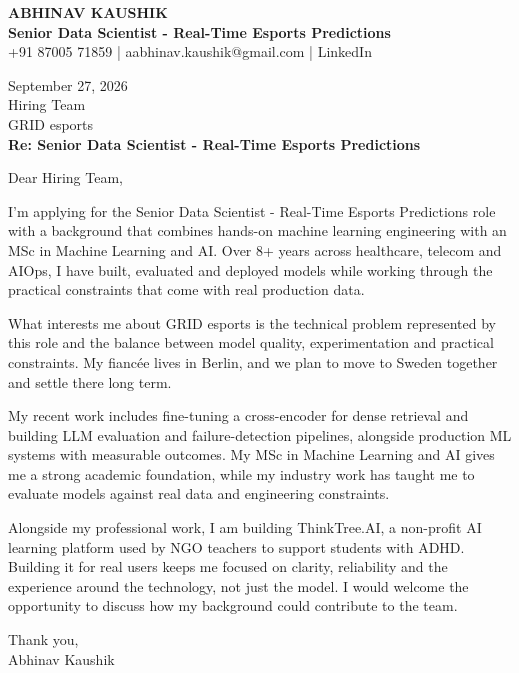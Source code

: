 \documentclass[10pt,a4paper]{article}
\begin{document}
\begin{center}
{\Large\bfseries ABHINAV KAUSHIK}\\[2pt]
{\bfseries Senior Data Scientist - Real-Time Esports Predictions}\\[2pt]
+91 87005 71859 \quad | \quad aabhinav.kaushik@gmail.com \quad | \quad LinkedIn
\end{center}
\vspace{8pt}
September 27, 2026\\[6pt]
Hiring Team\\
GRID esports\\[4pt]
\textbf{Re: Senior Data Scientist - Real-Time Esports Predictions}

Dear Hiring Team,

I’m applying for the Senior Data Scientist - Real-Time Esports Predictions role with a background that combines hands-on machine learning engineering with an MSc in Machine Learning and AI. Over 8+ years across healthcare, telecom and AIOps, I have built, evaluated and deployed models while working through the practical constraints that come with real production data.

What interests me about GRID esports is the technical problem represented by this role and the balance between model quality, experimentation and practical constraints. My fiancée lives in Berlin, and we plan to move to Sweden together and settle there long term.

My recent work includes fine-tuning a cross-encoder for dense retrieval and building LLM evaluation and failure-detection pipelines, alongside production ML systems with measurable outcomes. My MSc in Machine Learning and AI gives me a strong academic foundation, while my industry work has taught me to evaluate models against real data and engineering constraints.

Alongside my professional work, I am building ThinkTree.AI, a non-profit AI learning platform used by NGO teachers to support students with ADHD. Building it for real users keeps me focused on clarity, reliability and the experience around the technology, not just the model. I would welcome the opportunity to discuss how my background could contribute to the team.

Thank you,\\
Abhinav Kaushik
\end{document}
